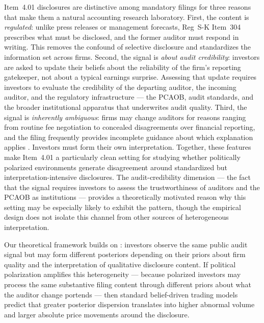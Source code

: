\documentclass[12pt]{article}
\begin{document}
Item~4.01 disclosures are distinctive among mandatory filings for three
reasons that make them a natural accounting research laboratory. First,
the content is \emph{regulated}: unlike press releases or management forecasts,
Reg~S-K Item~304 prescribes what must be disclosed, and the former auditor
must respond in writing. This removes the confound of selective disclosure
and standardizes the information set across firms. Second, the signal is
\emph{about audit credibility}: investors are asked to update their beliefs
about the reliability of the firm's reporting gatekeeper, not about a
typical earnings surprise. Assessing that update requires investors to
evaluate the credibility of the departing auditor, the incoming auditor,
and the regulatory infrastructure --- the PCAOB, audit standards, and the
broader institutional apparatus that underwrites audit quality. Third,
the signal is \emph{inherently ambiguous}: firms may change auditors for
reasons ranging from routine fee negotiation to concealed disagreements
over financial reporting, and the filing frequently provides incomplete
guidance about which explanation applies \citep{boone2001, beneish2005}.
Investors must form their own interpretation. Together, these features
make Item~4.01 a particularly clean setting for studying whether
politically polarized environments generate disagreement around
standardized but interpretation-intensive disclosures. The
audit-credibility dimension --- the fact that the signal requires
investors to assess the trustworthiness of auditors and the PCAOB as
institutions --- provides a theoretically motivated reason why this
setting may be especially likely to exhibit the pattern, though the
empirical design does not isolate this channel from other sources of
heterogeneous interpretation.

Our theoretical framework builds on \citet{kandel1995}: investors observe the
same public audit signal but may form different posteriors depending on their
priors about firm quality and the interpretation of qualitative disclosure
content. If political polarization amplifies this heterogeneity --- because
polarized investors may process the same substantive filing content through
different priors about what the auditor change portends --- then standard
belief-driven trading models \citep{harris1993} predict that greater
posterior dispersion translates into higher abnormal volume and larger
absolute price movements around the disclosure.
\end{document}
